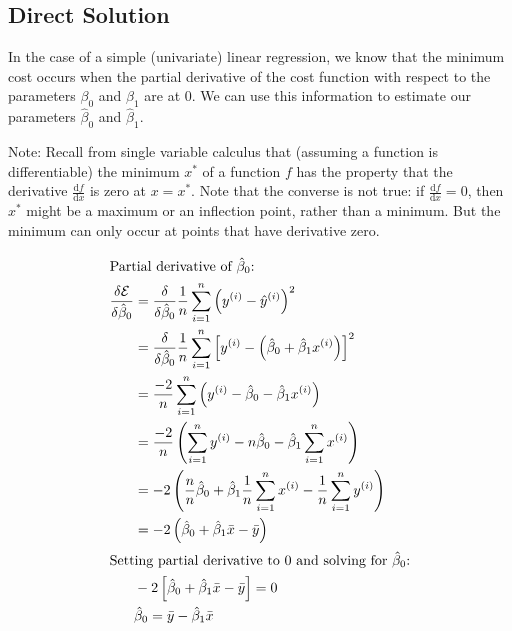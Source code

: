 \documentclass{report}
\begin{document}
\subsection{Direct Solution}
In the case of a simple (univariate) linear regression, we know that the minimum cost occurs when the partial derivative of the cost function with respect to the parameters \(\beta_0\) and \(\beta_1\) are at 0. We can use this information to estimate our parameters \(\hat\beta_0\) and \(\hat\beta_1\).

Note: Recall from single variable calculus that (assuming a function is differentiable) the minimum \(x^*\) of a function \(f\) has the property that the derivative \(\frac{\mathrm{d}f}{\mathrm{d}x}\) is zero at \(x = x^*\). Note that the converse is not true: if \(\frac{\mathrm{d}f}{\mathrm{d}x} = 0\), then \(x^*\) might be a maximum or an inflection point, rather than a minimum. But the minimum can only occur at points that have derivative zero.

\begin{align*}
	\intertext{Partial derivative of $\hat\beta_0$:}
	\frac{\delta\mathcal{E}}{\delta{\hat\beta_0}} &= \frac{\delta}{\delta{\hat\beta_0}}\frac{1}{n}\sum_{i=1}^n \left(y^{(i)} - \hat y^{(i)}\right)^2 \\
												  &= \frac{\delta}{\delta{\hat\beta_0}}\frac{1}{n}\sum_{i=1}^n \left[y^{(i)} - \left(\hat\beta_0 + \hat\beta_1 x^{(i)}\right)\right]^2 \\
												  &= \frac{-2}{n}\sum_{i=1}^n \left(y^{(i)} - \hat\beta_0 - \hat\beta_1 x^{(i)}\right)\\
												  &= \frac{-2}{n}\left(\sum_{i=1}^ny^{(i)} - n\hat\beta_0-\hat\beta_1\sum_{i=1}^nx^{(i)}\right) \\
												  &= -2\left(\frac{n}{n}\hat\beta_0+\hat\beta_1\frac{1}{n}\sum_{i=1}^nx^{(i)}-\frac{1}{n}\sum_{i=1}^ny^{(i)}\right)\\
												  &= -2\left(\hat\beta_0+\hat\beta_1\bar x-\bar y\right)\\
	\intertext{Setting partial derivative to 0 and solving for $\hat\beta_0$:}
												  &	-2\left[\hat\beta_0+\hat\beta_1\bar x-\bar y\right] = 0\\
												  &\hat\beta_0 = \bar{y} - \hat\beta_1\bar{x}
\end{align*}
\end{document}
